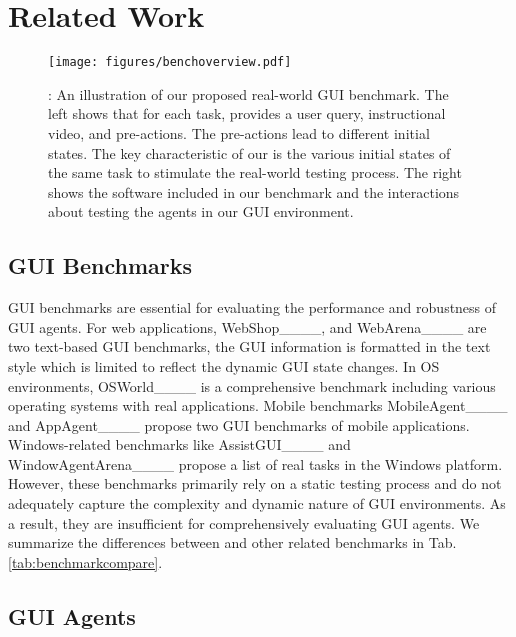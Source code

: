 \section{Related Work}
\begin{figure*}[t]

\begin{center}
\centerline{\texttt{[image: figures/benchoverview.pdf]}}
\vskip -0.1in
\caption{\textbf{\bench{}}: An illustration of our proposed real-world GUI benchmark. The left shows that for each task, \bench{} provides a user query, instructional video, and pre-actions. The pre-actions lead to different initial states. The key characteristic of our \bench{} is the various initial states of the same task to stimulate the real-world testing process. The right shows the software included in our benchmark and the interactions about testing the agents in our GUI environment.}
\label{fig:benchoverview}
\end{center}
\vskip -0.3in
\end{figure*}

\subsection{GUI Benchmarks}

GUI benchmarks are essential for evaluating the performance and robustness of GUI agents. For web applications, WebShop____, and WebArena____ are two text-based GUI benchmarks, the GUI information is formatted in the text style which is limited to reflect the dynamic GUI state changes. In OS environments, OSWorld____ is a comprehensive benchmark including various operating systems with real applications. Mobile benchmarks MobileAgent____ and AppAgent____ propose two GUI benchmarks of mobile applications. Windows-related benchmarks like AssistGUI____ and WindowAgentArena____ propose a list of real tasks in the Windows platform. 
However, these benchmarks primarily rely on a static testing process and do not adequately capture the complexity and dynamic nature of GUI environments. As a result, they are insufficient for comprehensively evaluating GUI agents. We summarize the differences between \bench{} and other related benchmarks in Tab. \ref{tab:benchmarkcompare}.

\subsection{GUI Agents}

